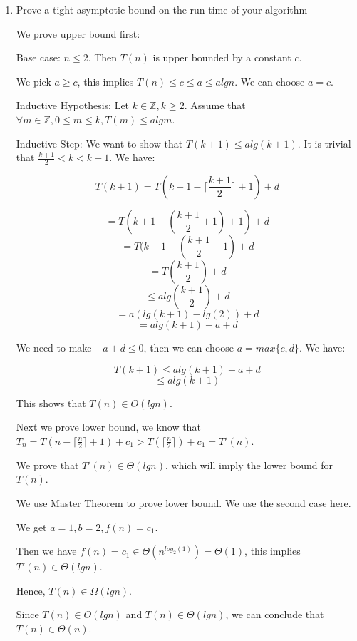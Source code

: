 \documentclass{cpsc413Solutions}
\begin{document}
\begin{problemlist}
\begin{problem}
\begin{enumerate}
\newpage
\item Prove a tight asymptotic bound on the run-time of your algorithm

We prove upper bound first:

Base case: $n \leq 2$. Then $T(n)$ is upper bounded by a constant $c$. 

We pick $a \geq c$, this implies $T(n) \leq c \leq a \leq algn$. We can choose $a=c$.

Inductive Hypothesis: Let $k \in \mathds{Z}, k \geq 2$. Assume that $\forall m \in \mathds{Z}, 0 \leq m\leq k, T(m) \leq algm $.

Inductive Step: We want to show that $T(k+1) \leq alg(k+1)$. It is trivial that $\frac{k+1}{2} < k <k+1$. We have:

$$T(k+1) = T(k+1 - \lceil \frac{k+1}{2} \rceil  +1)+d$$

$$= T (k+1-(\frac{k+1}{2}+1)+1)+d$$
$$= T(k+1-(\frac{k+1}{2}+1)+d$$
$$= T(\frac{k+1}{2})+d$$
$$\leq alg(\frac{k+1}{2})+d$$
$$=a(lg(k+1) - lg(2))+d$$
$$=alg(k+1) - a+d$$

We need to make $-a+d \leq 0$, then we can choose $a = max \{c,d \}$. We have:

$$T(k+1) \leq alg(k+1) -a+d$$
$$ \leq alg(k+1)$$

This shows that $T(n) \in O(lgn)$.

Next we prove lower bound, we know that $T_n = T(n - \lceil \frac{n}{2}\rceil + 1) + c_1 > T(\lceil \frac{n}{2}\rceil) +c_1 = T'(n)$.

We prove that $T'(n) \in \Theta(lgn)$, which will imply the lower bound for $T(n)$.

We use Master Theorem to prove lower bound. We use the second case here.

We get $a = 1, b=2, f(n) =c_1$.

Then we have $f(n) = c_1 \in \Theta(n^{log_2(1)})= \Theta(1)$, this implies $T'(n) \in \Theta(lgn)$.

Hence, $T(n) \in \Omega(lgn)$.

Since $T(n) \in O(lgn)$ and  $ T(n) \in \Theta(lgn)$, we can conclude that $T(n) \in \Theta(n)$.

\end{enumerate}
\end{problem}

\end{problemlist}
\end{document}
